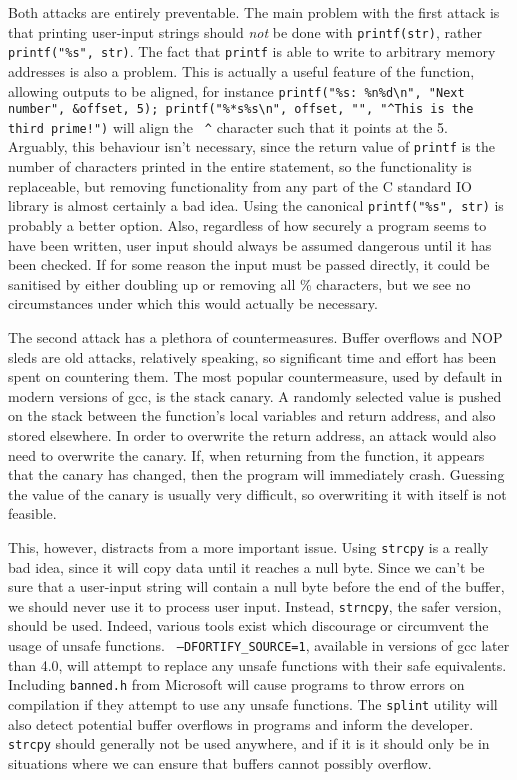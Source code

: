 Both attacks are entirely preventable. The main problem with the first attack is that printing user-input strings should
\emph{not} be done with {\tt printf(str)}, rather {\tt printf("\%s", str)}. The fact that {\tt printf} is able to write
to arbitrary memory addresses is also a problem. This is actually a useful feature of the function, allowing outputs to
be aligned, for instance {\tt printf("\%s: \%n\%d\textbackslash n", "Next number", \&offset, 5);
printf("\%*s\%s\textbackslash n", offset, "", "\textasciicircum This is the third prime!")} will align the {\tt
\textasciicircum} character such that it points at the 5. Arguably, this behaviour isn't necessary, since the return
value of {\tt printf} is the number of characters printed in the entire statement, so the functionality is replaceable,
but removing functionality from any part of the C standard IO library is almost certainly a bad idea. Using the
canonical {\tt printf("\%s", str)} is probably a better option. Also, regardless of how securely a program seems to have
been written, user input should always be assumed dangerous until it has been checked. If for some reason the input must
be passed directly, it could be sanitised by either doubling up or removing all \% characters, but we see no
circumstances under which this would actually be necessary.

The second attack has a plethora of countermeasures. Buffer overflows and NOP sleds are old attacks, relatively
speaking, so significant time and effort has been spent on countering them. The most popular countermeasure, used by
default in modern versions of gcc, is the stack canary. A randomly selected value is pushed on the stack between the
function's local variables and return address, and also stored elsewhere. In order to overwrite the return address, an
attack would also need to overwrite the canary. If, when returning from the function, it appears that the canary has
changed, then the program will immediately crash. Guessing the value of the canary is usually very difficult, so
overwriting it with itself is not feasible.

This, however, distracts from a more important issue. Using {\tt strcpy} is a really bad idea, since it will copy data
until it reaches a null byte. Since we can't be sure that a user-input string will contain a null byte before the end of
the buffer, we should never use it to process user input. Instead, {\tt strncpy}, the safer version, should be used.
Indeed, various tools exist which discourage or circumvent the usage of unsafe functions. {\tt
--DFORTIFY\_SOURCE=1}\cite{fort_source}, available in versions of gcc later than 4.0, will attempt to replace any unsafe
functions with their safe equivalents. Including {\tt banned.h} from Microsoft\cite{banned} will cause programs to throw
errors on compilation if they attempt to use any unsafe functions. The {\tt splint} utility will also detect potential
buffer overflows in programs and inform the developer. {\tt strcpy} should generally not be used anywhere, and if it is
it should only be in situations where we can ensure that buffers cannot possibly overflow.

